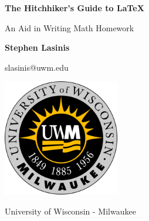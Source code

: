 \documentclass[]{article}
\begin{document}
    \begin{titlepage}
        \begin{center}
        
            \vspace{3in}

            \LARGE
            \textbf{The Hitchhiker's Guide to LaTeX}

            \vspace{0.1in}

            \normalsize
            An Aid in Writing Math Homework

            \vspace{1in}

            \large
            \textbf{Stephen Lasinis}

            \vspace{0.2cm}

            \normalsize
            slasinis@uwm.edu
            
            \vfill

            \normalsize
            
            \vspace{0.2in}

            \includegraphics[width=2in]{uwm.png}

            \vspace{0.25in}

            University of Wisconsin - Milwaukee
        \end{center}
    \end{titlepage}

    \newpage

    \tableofcontents

    \newpage
\end{document}
